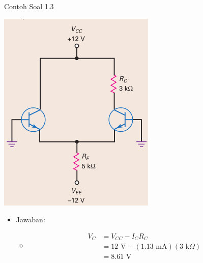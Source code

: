 \documentclass[aspectratio=169]{beamer}
\begin{document}
\begin{frame}{Contoh Soal 1.3}
	\begin{multicols}{2}
		\begin{center}
			\includegraphics[width=0.6\textheight]{gambar/01.latihan_soal_3}
		\end{center}
		\columnbreak
		\begin{itemize}
			\item Jawaban:
			\begin{itemize}
				\item[]
				\begin{align*}
					V_C &= V_{CC} - I_C R_C \\
					&= 12 \text{ V} - (1.13 \text{ mA})(3 \text{ k}\Omega) \\
					&= 8.61 \text{ V}
				\end{align*}
			\end{itemize}
		\end{itemize}
		\vfill\null
	\end{multicols}
\end{frame}
\end{document}
